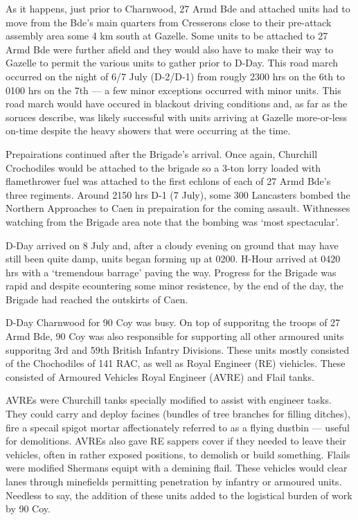 \documentclass[noraggedright]{turabian-researchpaper}
\newcommand{\CharnAdm}{27 Armd Bde Adm Order No. 7, 7 July 1944}
\begin{document}
As it happens, just prior to Charnwood, 27 Armd Bde and attached units
had to move from the Bde's main quarters from Cresserons close to their 
pre-attack assembly area some 4 km south at Gazelle.  Some units to be 
attached to 27 Armd Bde were further afield and they would also have to
make their way to Gazelle to permit the various units to gather prior to 
D-Day.  This road march occurred on the night of 6/7 July (D-2/D-1) from
rougly 2300 hrs on the 6th to 0100 hrs on the 7th --- a few minor exceptions
occurred with minor units.\autocite[Appendix C, 27 Armd Bde Operation Order 
No 2, 6 July 1944]{27wd}  This road march would have occured in
blackout driving conditions and, as far as the soruces describe, was likely
successful with units arriving at Gazelle more-or-less on-time despite the
heavy showers that were occurring at the time.\autocite[6 June 1944]{1raf}

Prepairations continued after the Brigade's arrival.  Once again, Churchill
Crochodiles would be attached to the brigade so a 3-ton lorry loaded with 
flamethrower fuel was attached to the first echlons of each of 27 Armd Bde's
three regiments.\autocite[7 July 1944]{90wd}  Around 2150 hrs D-1 (7 July), 
some 300 Lancasters bombed the Northern Approaches to Caen in prepairation 
for the coming assault. Withnesses watching from the Brigade area note that 
the bombing was `most spectacular'.\autocite[7 July 1944]{27wd} 

D-Day arrived on 8 July and,
after a cloudy evening on ground that may have still been quite damp, 
units began forming up at 0200. 
H-Hour arrived at 0420 hrs with a `tremendous barrage' paving the 
way.\autocite[8 July 1944]{27wd}  Progress for the Brigade was rapid and
despite ecountering some minor resistence, by the end of the day, the 
Brigade had reached the outskirts of Caen.\autocite[8 July 1944]{27wd}

D-Day Charnwood for 90 Coy was busy.  On top of supporitng the troops of
27 Armd Bde, 90 Coy was also responsible for supporting all other armoured
units supporitng 3rd and 59th British Infantry Divisions.\autocite
[\CharnAdm][Para. 3]{27wd}  These units mostly consisted of the Chochodiles
of 141 RAC, as well as Royal Engineer (RE) viehicles.  These consisted of 
Armoured Vehicles Royal Engineer (AVRE) and Flail tanks.  

AVREs were 
Churchill tanks specially modified to assist with engineer tasks.  They
could carry and deploy facines (bundles of tree branches for filling
ditches), fire a specail spigot mortar affectionately referred to as a 
flying dustbin --- useful for demolitions.  AVREs also gave RE sappers 
cover if they needed to leave their vehicles, often in rather exposed 
positions, to demolish or build something.  
Flails were modified Shermans equipt with a demining flail.  These
vehicles would clear lanes through minefields permitting penetration by
infantry or armoured units.  Needless to say, the addition of these
units added to the logistical burden of work by 90 Coy. 
\end{document}
